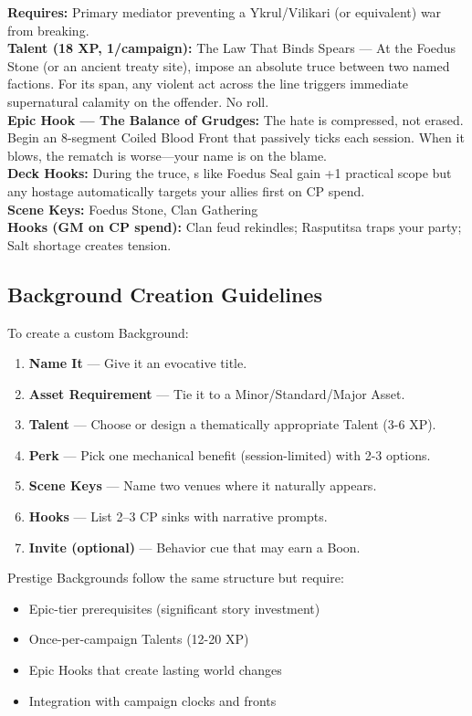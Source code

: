 \documentclass[12pt]{article}
\begin{document}
\begin{description}[leftmargin=*]
  \item[\textbf{Keeper of the Foedus Stone}] 
  \textbf{Requires:} Primary mediator preventing a Ykrul/Vilikari (or equivalent) war from breaking. \\
  \textbf{Talent (18 XP, 1/campaign):} The Law That Binds Spears — At the Foedus Stone (or an ancient treaty site), impose an absolute truce between two named factions. For its span, any violent act across the line triggers immediate supernatural calamity on the offender. No roll. \\
  \textbf{Epic Hook — The Balance of Grudges:} The hate is compressed, not erased. Begin an 8-segment Coiled Blood Front that passively ticks each session. When it blows, the rematch is worse—your name is on the blame. \\
  \textbf{Deck Hooks:} During the truce, s like Foedus Seal gain +1 practical scope but any hostage automatically targets your allies first on CP spend. \\
  \textbf{Scene Keys:} Foedus Stone, Clan Gathering \\
  \textbf{Hooks (GM on CP spend):} Clan feud rekindles; Rasputitsa traps your party; Salt shortage creates tension.

\end{description}

\subsection*{Background Creation Guidelines}

To create a custom Background:
\begin{enumerate}
  \item \textbf{Name It} — Give it an evocative title.
  \item \textbf{Asset Requirement} — Tie it to a Minor/Standard/Major Asset.
  \item \textbf{Talent} — Choose or design a thematically appropriate Talent (3-6 XP).
  \item \textbf{Perk} — Pick one mechanical benefit (session-limited) with 2-3 options.
  \item \textbf{Scene Keys} — Name two venues where it naturally appears.
  \item \textbf{Hooks} — List 2–3 CP sinks with narrative prompts.
  \item \textbf{Invite (optional)} — Behavior cue that may earn a Boon.
\end{enumerate}

Prestige Backgrounds follow the same structure but require:
\begin{itemize}
  \item Epic-tier prerequisites (significant story investment)
  \item Once-per-campaign Talents (12-20 XP)
  \item Epic Hooks that create lasting world changes
  \item Integration with campaign clocks and fronts
\end{itemize}
\end{document}

